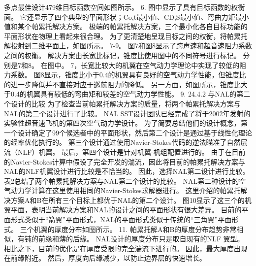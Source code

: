 \documentclass[UTF8,11pt,a4paper,openany,fontset=fandol]{ctexbook}
\begin{document}
多点最佳设计479维目标函数空间如图所示。 6. 图中显示了具有目标函数的权衡面。 它还显示了四个典型的平面形状；Co,t最小值、CD,S最小值、弯曲力矩最小值和某个帕累托解决方案。 极端的帕累托解决方案，三个最小化各自目标功能的平面形状在物理上看起来很合理。 为了更清楚地呈现目标之间的权衡，将帕累托解投射到二维平面上，如图所示。 7-9。 图7和图8显示了跨声速和超音速阻力系数之间的权衡。 解决方案由长宽比标记，锥度比使用图中的不同符号进行标记。 分别是7和8。 在图中。 7，长宽比较大的机翼在空气动力学理论中实现了较低的阻力系数。 图8显示，锥度比小于0.4的机翼具有良好的空气动力学性能，但锥度比的进一步降低并不直接对应于巡航阻力的降低。 另一方面，如图所示，锥度比大于0.4的机翼具有较低的弯曲矩和较差的空气动力学性能。 9. 24.4.2 与NAL的第二个设计的比较 为了检查当前帕累托解决方案的质量，将两个帕累托解决方案与NAL的第二个设计进行了比较。 NAL SST设计团队已经完成了将于2002年发射的实验性超音速飞机的第四次空气动力学设计。 为了简要总结他们的设计概念，第一个设计确定了99个候选者中的平面形状，然后第二个设计是通过基于线性化理论的经率优化执行的。 第三个设计通过使用Navier-Stokes代码的逆法瞄准了自然层流（NLF）机翼。 最后，第四个设计是针对机翼-机组配置进行的。 由于在目前的Navier-Stokes计算中假设了完全开发的湍流，因此将目前的帕累托解决方案与NAL的NLF机翼设计进行比较是不恰当的。 因此，选择NAL第二设计进行比较。 表2总结了两个帕累托解决方案与NAL第二个设计的比较。 NAL第二种设计的空气动力学计算在这里使用相同的Navier-Stokes求解器进行。 这里介绍的帕累托解决方案A和B在所有三个目标上都优于NAL的第二个设计。 图10显示了这三个的机翼平面，表明当前解决方案和NAL的设计之间的平面形状有很大差异。 目前的平面形式类似于“箭翼”平面形式，NAL的平面形式类似于传统的“三角翼”平面形式。 三个机翼的厚度分布如图所示。 11. 帕累托解A和B的厚度分布趋势非常相似，有钝的前缘和薄的后缘。 NAL设计的厚度分布只是取自现有的NLF 翼型。 相比之下，目前的优化是在厚度受限的完全湍流下进行的。 因此，最大厚度出现在前缘附近。 然后，厚度向后缘减少，以防止边界层的快速增长。
\end{document}
